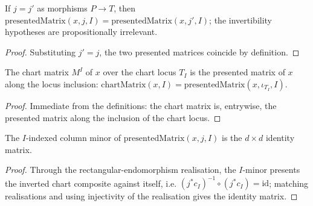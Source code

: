 \begin{lemma}\leanok
  \label{lem:gr_presentedMatrix_congr}
  If \(j = j'\) as morphisms \(P \to T\), then \(\mathrm{presentedMatrix}(x, j, I) =
  \mathrm{presentedMatrix}(x, j', I)\); the invertibility hypotheses are propositionally
  irrelevant.
\end{lemma}
\begin{proof}
  Substituting \(j' = j\), the two presented matrices coincide by definition.
\end{proof}

\begin{lemma}\leanok
  \label{lem:gr_chartMatrix_eq_presentedMatrix}
  The chart matrix \(M^I\) of \(x\) over the chart locus \(T_I\) is the presented matrix of
  \(x\) along the locus inclusion: \(\mathrm{chartMatrix}(x, I) =
  \mathrm{presentedMatrix}(x, \iota_{T_I}, I)\).
\end{lemma}
\begin{proof}
  Immediate from the definitions: the chart matrix is, entrywise, the presented matrix along
  the inclusion of the chart locus.
\end{proof}

\begin{lemma}\leanok
  \label{lem:gr_presentedMatrix_submatrix_self}
  The \(I\)-indexed column minor of \(\mathrm{presentedMatrix}(x, j, I)\) is the \(d\times d\)
  identity matrix.
\end{lemma}
\begin{proof}
  Through the rectangular-endomorphism realisation, the \(I\)-minor presents the inverted
  chart composite against itself, i.e. \((j^{*}c_I)^{-1}\circ (j^{*}c_I) = \mathrm{id}\);
  matching realisations and using injectivity of the realisation gives the identity matrix.
\end{proof}

